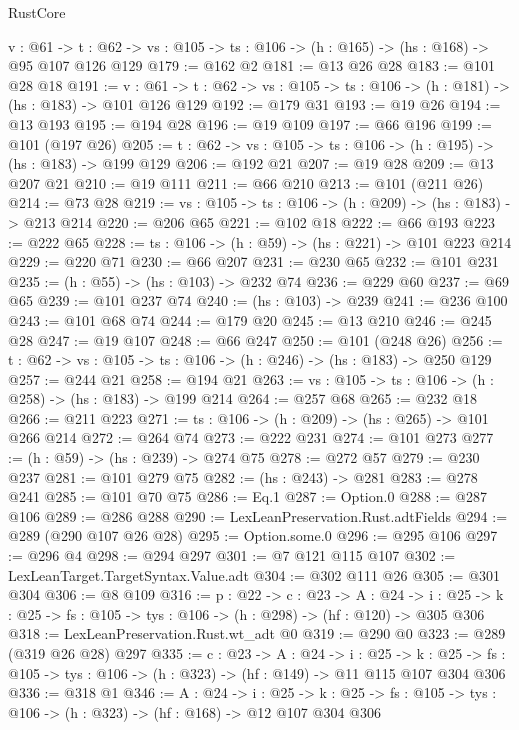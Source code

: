 \begin{lexlean}{RustCore}
\begin{coremodule}
  {v : @61} ->
  {t : @62} -> {vs : @105} -> {ts : @106} -> (h : @165) -> (hs : @168) -> @95 @107 @126 @129
@179 := @162 @2
@181 := @13 @26 @28
@183 := @101 @28 @18
@191 := {v : @61} ->
  {t : @62} -> {vs : @105} -> {ts : @106} -> (h : @181) -> (hs : @183) -> @101 @126 @129
@192 := @179 @31
@193 := @19 @26
@194 := @13 @193
@195 := @194 @28
@196 := @19 @109
@197 := @66 @196
@199 := @101 (@197 @26)
@205 := {t : @62} -> {vs : @105} -> {ts : @106} -> (h : @195) -> (hs : @183) -> @199 @129
@206 := @192 @21
@207 := @19 @28
@209 := @13 @207 @21
@210 := @19 @111
@211 := @66 @210
@213 := @101 (@211 @26)
@214 := @73 @28
@219 := {vs : @105} -> {ts : @106} -> (h : @209) -> (hs : @183) -> @213 @214
@220 := @206 @65
@221 := @102 @18
@222 := @66 @193
@223 := @222 @65
@228 := {ts : @106} -> (h : @59) -> (hs : @221) -> @101 @223 @214
@229 := @220 @71
@230 := @66 @207
@231 := @230 @65
@232 := @101 @231
@235 := (h : @55) -> (hs : @103) -> @232 @74
@236 := @229 @60
@237 := @69 @65
@239 := @101 @237 @74
@240 := (hs : @103) -> @239
@241 := @236 @100
@243 := @101 @68 @74
@244 := @179 @20
@245 := @13 @210
@246 := @245 @28
@247 := @19 @107
@248 := @66 @247
@250 := @101 (@248 @26)
@256 := {t : @62} -> {vs : @105} -> {ts : @106} -> (h : @246) -> (hs : @183) -> @250 @129
@257 := @244 @21
@258 := @194 @21
@263 := {vs : @105} -> {ts : @106} -> (h : @258) -> (hs : @183) -> @199 @214
@264 := @257 @68
@265 := @232 @18
@266 := @211 @223
@271 := {ts : @106} -> (h : @209) -> (hs : @265) -> @101 @266 @214
@272 := @264 @74
@273 := @222 @231
@274 := @101 @273
@277 := (h : @59) -> (hs : @239) -> @274 @75
@278 := @272 @57
@279 := @230 @237
@281 := @101 @279 @75
@282 := (hs : @243) -> @281
@283 := @278 @241
@285 := @101 @70 @75
@286 := Eq.{1}
@287 := Option.{0}
@288 := @287 @106
@289 := @286 @288
@290 := LexLeanPreservation.Rust.adtFields
@294 := @289 (@290 @107 @26 @28)
@295 := Option.some.{0}
@296 := @295 @106
@297 := @296 @4
@298 := @294 @297
@301 := @7 @121 @115 @107
@302 := LexLeanTarget.TargetSyntax.Value.adt
@304 := @302 @111 @26
@305 := @301 @304
@306 := @8 @109
@316 := {p : @22} ->
  {c : @23} ->
  {A : @24} ->
  {i : @25} -> {k : @25} -> {fs : @105} -> {tys : @106} -> (h : @298) -> (hf : @120) -> @305 @306
@318 := LexLeanPreservation.Rust.wt_adt @0
@319 := @290 @0
@323 := @289 (@319 @26 @28) @297
@335 := {c : @23} ->
  {A : @24} ->
  {i : @25} ->
  {k : @25} -> {fs : @105} -> {tys : @106} -> (h : @323) -> (hf : @149) -> @11 @115 @107 @304 @306
@336 := @318 @1
@346 := {A : @24} ->
  {i : @25} ->
  {k : @25} -> {fs : @105} -> {tys : @106} -> (h : @323) -> (hf : @168) -> @12 @107 @304 @306

\end{coremodule}
\end{lexlean}

